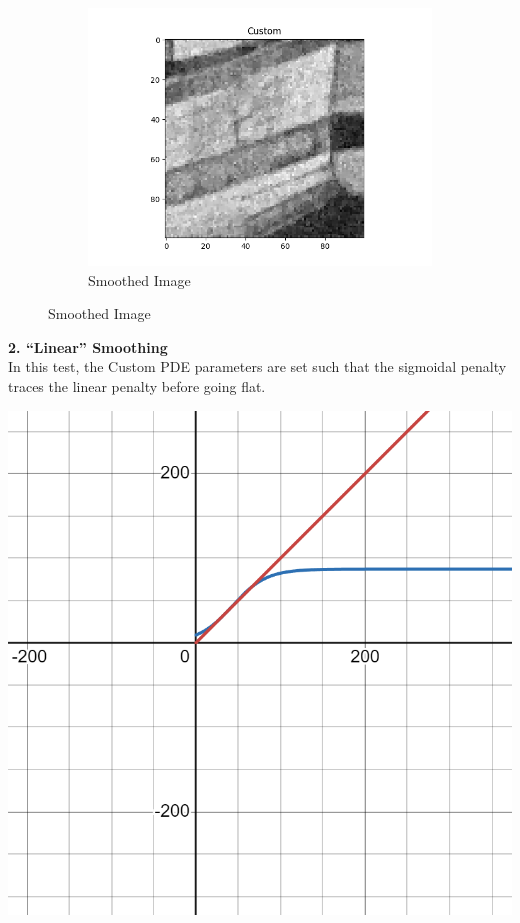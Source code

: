 \documentclass{article}
\begin{document}
\begin{center}
\begin{figure}[!htb]
\begin{center}
        \begin{subfigure}[b]{0.3\textwidth}
          \includegraphics[width=\textwidth]{../generated_images/Custom_test1.png}
          \caption{Smoothed Image}
        \end{subfigure}
      \end{center}
    \end{figure}
  \end{center}

  \newpage
  \noindent
  \textbf{2. ``Linear'' Smoothing}\\
  In this test, the Custom PDE parameters are set such that the sigmoidal penalty
  traces the linear penalty before going flat.
  \begin{center}
    \includegraphics[scale=0.1]{../report_images/linear_smoothing.png}\\
  \end{center}
\end{document}
